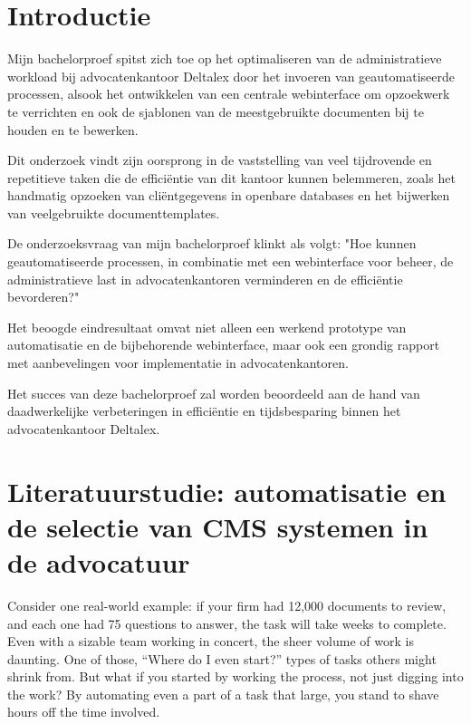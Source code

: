\section{Introductie}%
\label{sec:introductie}

Mijn bachelorproef spitst zich toe op het optimaliseren van de administratieve workload bij advocatenkantoor Deltalex door het invoeren van geautomatiseerde processen, alsook het
ontwikkelen van een centrale webinterface om opzoekwerk te verrichten en ook de sjablonen van de meestgebruikte documenten bij te houden en te bewerken.

Dit onderzoek vindt zijn oorsprong in de vaststelling van veel tijdrovende en repetitieve taken die de efficiëntie van dit kantoor kunnen belemmeren,
zoals het handmatig opzoeken van cliëntgegevens in openbare databases en het bijwerken van veelgebruikte documenttemplates.

De onderzoeksvraag van mijn bachelorproef klinkt als volgt: "Hoe kunnen geautomatiseerde processen, in combinatie met een webinterface voor beheer, de administratieve
last in advocatenkantoren verminderen en de efficiëntie bevorderen?"

Het beoogde eindresultaat omvat niet alleen een werkend prototype van automatisatie en de bijbehorende webinterface,
maar ook een grondig rapport met aanbevelingen voor implementatie in advocatenkantoren.

Het succes van deze bachelorproef zal worden beoordeeld aan de hand van daadwerkelijke verbeteringen in efficiëntie en
tijdsbesparing binnen het advocatenkantoor Deltalex.

\section{Literatuurstudie: automatisatie en de selectie van CMS systemen in de advocatuur}%
\label{sec:state-of-the-art}

Consider one real-world example: if your firm had 12,000 documents to review, and each one had 75 questions to answer, the task will take weeks to complete. Even with a sizable team working in concert, the sheer volume of work is daunting. One of those, “Where do I even start?” types of tasks others might shrink from.
But what if you started by working the process, not just digging into the work? By automating even a part of a task that large, you stand to shave hours off the time involved.
\autocite{ThomsonReuters2023}

